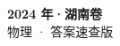 \documentclass[zihao=-4, a4paper]{ctexart}
\begin{document}
\begin{center}
  {\Large\bfseries 2024 年·湖南卷}\\[4pt]
  {\large 物理 · 答案速查版}
\end{center}
\medskip
{}

\clearpage
{}

\end{document}
